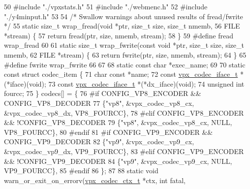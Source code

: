 \begin{DoxyCodeInclude}
50 \textcolor{preprocessor}{#include "./vpxstats.h"}
51 \textcolor{preprocessor}{#include "./webmenc.h"}
52 \textcolor{preprocessor}{#include "./y4minput.h"}
53 
54 \textcolor{comment}{/* Swallow warnings about unused results of fread/fwrite */}
55 \textcolor{keyword}{static} \textcolor{keywordtype}{size\_t} wrap\_fread(\textcolor{keywordtype}{void} *ptr, \textcolor{keywordtype}{size\_t} size, \textcolor{keywordtype}{size\_t} nmemb,
56                          FILE *stream) \{
57   \textcolor{keywordflow}{return} fread(ptr, size, nmemb, stream);
58 \}
59 \textcolor{preprocessor}{#define fread wrap\_fread}
60 
61 \textcolor{keyword}{static} \textcolor{keywordtype}{size\_t} wrap\_fwrite(\textcolor{keyword}{const} \textcolor{keywordtype}{void} *ptr, \textcolor{keywordtype}{size\_t} size, \textcolor{keywordtype}{size\_t} nmemb,
62                           FILE *stream) \{
63   \textcolor{keywordflow}{return} fwrite(ptr, size, nmemb, stream);
64 \}
65 \textcolor{preprocessor}{#define fwrite wrap\_fwrite}
66 
67 
68 \textcolor{keyword}{static} \textcolor{keyword}{const} \textcolor{keywordtype}{char} *exec\_name;
69 
70 \textcolor{keyword}{static} \textcolor{keyword}{const} \textcolor{keyword}{struct }codec\_item \{
71   \textcolor{keywordtype}{char} \textcolor{keyword}{const}              *name;
72   \textcolor{keyword}{const} \hyperlink{group__codec_gae99c3b04f4a567a311211cce3ae6b83b}{vpx\_codec\_iface\_t} *(*iface)(void);
73   \textcolor{keyword}{const} \hyperlink{group__codec_gae99c3b04f4a567a311211cce3ae6b83b}{vpx\_codec\_iface\_t} *(*dx\_iface)(void);
74   \textcolor{keywordtype}{unsigned} \textcolor{keywordtype}{int}             fourcc;
75 \} codecs[] = \{
76 \textcolor{preprocessor}{#if CONFIG\_VP8\_ENCODER && CONFIG\_VP8\_DECODER}
77   \{\textcolor{stringliteral}{"vp8"}, &vpx\_codec\_vp8\_cx, &vpx\_codec\_vp8\_dx, VP8\_FOURCC\},
78 \textcolor{preprocessor}{#elif CONFIG\_VP8\_ENCODER && !CONFIG\_VP8\_DECODER}
79   \{\textcolor{stringliteral}{"vp8"}, &vpx\_codec\_vp8\_cx, NULL, VP8\_FOURCC\},
80 \textcolor{preprocessor}{#endif}
81 \textcolor{preprocessor}{#if CONFIG\_VP9\_ENCODER && CONFIG\_VP9\_DECODER}
82   \{\textcolor{stringliteral}{"vp9"}, &vpx\_codec\_vp9\_cx, &vpx\_codec\_vp9\_dx, VP9\_FOURCC\},
83 \textcolor{preprocessor}{#elif CONFIG\_VP9\_ENCODER && !CONFIG\_VP9\_DECODER}
84   \{\textcolor{stringliteral}{"vp9"}, &vpx\_codec\_vp9\_cx, NULL, VP9\_FOURCC\},
85 \textcolor{preprocessor}{#endif}
86 \};
87 
88 \textcolor{keyword}{static} \textcolor{keywordtype}{void} warn\_or\_exit\_on\_errorv(\hyperlink{structvpx__codec__ctx}{vpx\_codec\_ctx\_t} *ctx, \textcolor{keywordtype}{int} fatal,

\end{DoxyCodeInclude}

